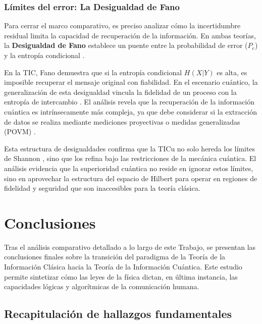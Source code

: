 \documentclass[11pt,a4paper,spanish]{book}
\begin{document}
\subsection{Límites del error: La Desigualdad de Fano}

Para cerrar el marco comparativo, es preciso analizar cómo la incertidumbre residual limita la capacidad de recuperación de la información. En ambas teorías, la \textbf{Desigualdad de Fano} establece un puente entre la probabilidad de error ($P_e$) y la entropía condicional \citep{fano1961}. 

En la TIC, Fano demuestra que si la entropía condicional $H(X|Y)$ es alta, es imposible recuperar el mensaje original con fiabilidad. En el escenario cuántico, la generalización de esta desigualdad vincula la fidelidad de un proceso con la entropía de intercambio \citep{nielsen2010}. El análisis revela que la recuperación de la información cuántica es intrínsecamente más compleja, ya que debe considerar si la extracción de datos se realiza mediante mediciones proyectivas o medidas generalizadas (POVM) \citep{helstrom1969}. 

Esta estructura de desigualdades confirma que la TICu no solo hereda los límites de Shannon \citep{shannon1948}, sino que los refina bajo las restricciones de la mecánica cuántica. El análisis evidencia que la superioridad cuántica no reside en ignorar estos límites, sino en aprovechar la estructura del espacio de Hilbert para operar en regiones de fidelidad y seguridad que son inaccesibles para la teoría clásica.

\chapter{Conclusiones}

Tras el análisis comparativo detallado a lo largo de este Trabajo, se presentan las conclusiones finales sobre la transición del paradigma de la Teoría de la Información Clásica hacia la Teoría de la Información Cuántica. Este estudio permite sintetizar cómo las leyes de la física dictan, en última instancia, las capacidades lógicas y algorítmicas de la comunicación humana.

\section{Recapitulación de hallazgos fundamentales}
\end{document}
